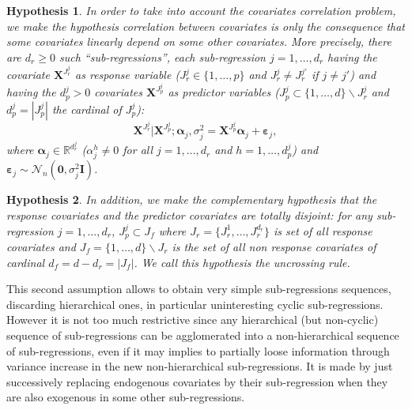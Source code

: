 \documentclass[12pt,a4paper]{report}
\newtheorem{hyp}{Hypothesis}
\begin{document}
\begin{hyp}\label{H1}
In order to take into account the covariates correlation problem, we make the hypothesis correlation between covariates is {\it only} the consequence that some covariates {\it linearly} depend on some other covariates. More precisely, there are $d_{r}\geq 0$ such ``sub-regressions'', each sub-regression $j=1,\ldots,d_{r}$ having the covariate $\boldsymbol{X}^{J_{r}^j}$ as {\it response} variable ($J_{r}^j\in\{1,\ldots,p\}$ and $J_{r}^j\neq J_{r}^{j'}$ if $j\neq j'$) and having the $d_p^j>0$ covariates $\boldsymbol{X}^{J_{p}^j}$  as {\it predictor} variables ($J_{p}^j\subset\{1,\ldots,d\} \backslash J_{r}^j$ and $d_p^j=|J_{p}^j|$ the cardinal of $J_{p}^j$):
\begin{equation}
\boldsymbol{X}^{J_{r}^j}|\boldsymbol{X}^{J_{p}^j};\boldsymbol{\alpha}_j,\sigma^2_j=\boldsymbol{X}^{J_{p}^j}\boldsymbol{\alpha}_j+\boldsymbol{\varepsilon}_j, \label{eq:SR}
\end{equation}
where $\boldsymbol{\alpha}_j\in{\mathbb{R}^{d_r^j}}$ (${\alpha}_j^h\neq 0$ for all $j=1,\ldots,d_r$ and $h=1,\ldots,d_p^j$) and $\boldsymbol{\varepsilon}_j \sim\mathcal{N}_n(\boldsymbol{0},\sigma^2_j\boldsymbol{I})$.
\end{hyp}

\begin{hyp}\label{H2}
In addition, we make the complementary hypothesis that the response covariates and the predictor covariates are totally disjoint: for any sub-regression $j=1,\ldots,d_{r}$, $J_{p}^j\subset J_f$ where $J_{r}=\{J_{r}^1,\ldots,J_{r}^{d_r}\}$ is set of all response covariates and $J_f=\{1,\ldots,d\} \backslash J_{r}$ is the set of all {\it non} response covariates of cardinal $d_f=d-d_r=|J_f|$. We call this hypothesis the uncrossing rule.
\end{hyp}



 This second assumption allows to obtain very simple sub-regressions sequences, discarding hierarchical ones, in particular uninteresting cyclic sub-regressions. However it is not too much restrictive since any hierarchical (but non-cyclic) sequence of sub-regressions can be agglomerated into a non-hierarchical sequence of sub-regressions, even if it may implies to partially loose information through variance increase in the new non-hierarchical sub-regressions. It is made by just successively replacing endogenous covariates by their sub-regression when they are also exogenous in some other sub-regressions. 
\end{document}
